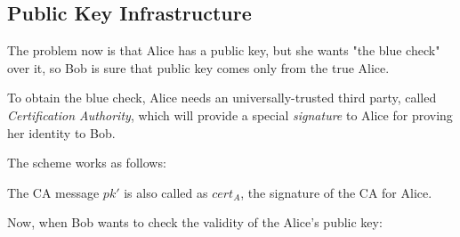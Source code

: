 \subsection{Public Key Infrastructure}

The problem now is that Alice has a public key, but she wants "the blue check" over it, so Bob is sure that public key comes only from the true Alice.

To obtain the blue check, Alice needs an universally-trusted third party, called \textit{Certification Authority}, which will provide a special \textit{signature} to Alice for proving her identity to Bob.

The scheme works as follows:

\begin{figure}
    \centering
    \sdinit{}
\end{figure}

The CA message $pk'$ is also called as $cert_{A}$, the signature of the CA for Alice.

Now, when Bob wants to check the validity of the Alice's public key:

